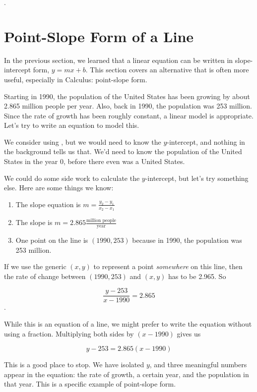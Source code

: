 \documentclass[nooutcomes]{ximera}
\begin{document}
.



\section{Point-Slope Form of a Line}

In the previous section, we learned that a linear equation can be written in slope-intercept form, $y=mx+b$. This section covers an alternative that is often more useful, especially in Calculus: point-slope form.

\begin{example}
Starting in 1990, the population of the United States has been growing by about 2.865  million people per year. Also, back in 1990, the population was 253 million. Since the rate of growth has been roughly constant, a linear model is appropriate. Let's try to write an equation to model this.

\begin{explanation}
We consider using , but we would need to know the $y$-intercept, and nothing in the background tells us that. We'd need to know the population of the United States in the year 0, before there even was a United States.

We could do some side work to calculate the $y$-intercept, but let's try something else. Here are some things we know:
\begin{enumerate}
\item The slope equation is $m=\frac{y_2-y_1}{x_2-x_1}$
\item The slope is $m=2.865 \frac{\text{million people}}{\text{year}}$
\item One point on the line is $(1990,253)$ because in 1990, the population was 253 million.
\end{enumerate}

If we use the generic $(x,y)$ to represent a point \textit{somewhere} on this line, then the rate of change between $(1990,253)$ and $(x,y)$  has to be 2.965.  So

$$\frac{y-253}{x-1990}=2.865$$.

While this is an equation of a line, we might prefer to write the equation without using a fraction.  Multiplying both sides by $(x-1990)$ gives us

$$y-253=2.865(x-1990)$$

This is a good place to stop. We have isolated $y$, and three meaningful numbers appear in the equation: the rate of growth, a certain year, and the population in that year. This is a specific example of point-slope form. 
\end{explanation}
\end{example}
\end{document}

